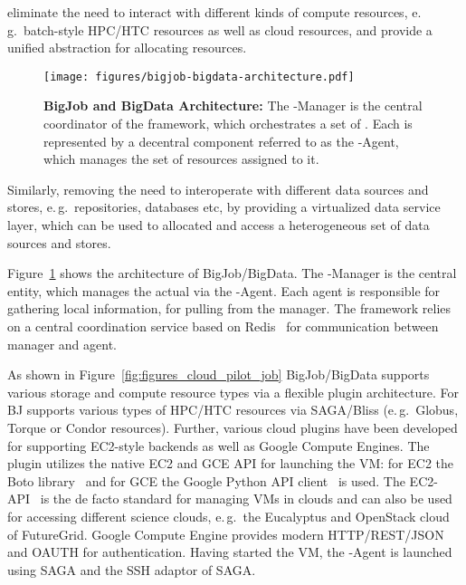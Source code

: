 \documentclass{sig-alternate}
\begin{document}
\pilotjobs eliminate the need to interact with different kinds of compute 
resources, e.\,g.\ batch-style HPC/HTC resources as well as cloud resources, 
and provide a unified abstraction for allocating resources. 

\begin{figure}[t]
	\upp	\upp	\upp
	\centering
	\texttt{[image: figures/bigjob-bigdata-architecture.pdf]}
	\caption{\textbf{BigJob and BigData Architecture:} The \pilot-Manager is 
	the central coordinator of the framework, which orchestrates a set of 
	\pilots. Each \pilot is represented by a decentral component referred to 
	as the \pilot-Agent, which manages the set of resources assigned to it. }
	\label{fig:figures_bigjob-bigdata-architecture}
\end{figure}

Similarly, \pilotdata removing the need to interoperate with different
data sources and stores, e.\,g.\ repositories, databases etc, by
providing a virtualized data service layer, which can be used to
allocated and access a heterogeneous set of data sources and stores.

Figure~\ref{fig:figures_bigjob-bigdata-architecture} shows the
architecture of BigJob/BigData. The \pilot-Manager is the central
entity, which manages the actual \pilots via the \pilot-Agent. Each
agent is responsible for gathering local information, for pulling
\computeunits from the manager. The framework relies on a central
coordination service based on Redis~\cite{redis} for communication
between manager and agent.

As shown in Figure~\ref{fig:figures_cloud_pilot_job} BigJob/BigData supports
various storage and compute resource types via a flexible plugin architecture.
For \pilotcomputes BJ supports various types of HPC/HTC resources via
SAGA/Bliss (e.\,g.\ Globus, Torque or Condor resources). Further, various
cloud plugins have been developed for supporting EC2-style backends as well as
Google Compute Engines. The plugin utilizes the native EC2 and GCE API for
launching the VM: for EC2 the Boto library~\cite{boto} and for GCE 
the Google Python API client~\cite{google-api-client} is used.
The EC2-API~\cite{amazonec2api} is the de facto standard for
managing VMs in clouds and can also be used for accessing different science
clouds, e.\,g.\ the Eucalyptus and OpenStack cloud of FutureGrid. Google
Compute Engine provides modern HTTP/REST/JSON and OAUTH for authentication.
Having started the VM, the \pilot-Agent is launched using SAGA and the SSH
adaptor of SAGA.
\end{document}
